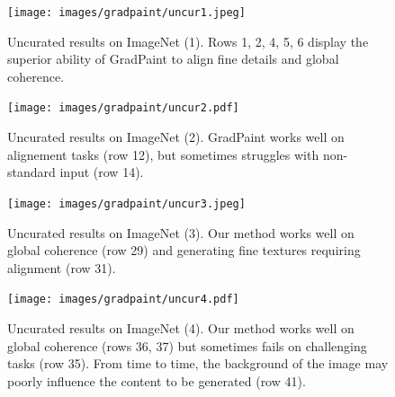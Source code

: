 \begin{figure}[htbp]
  \centering
    \texttt{[image: images/gradpaint/uncur1.jpeg]}
    \caption{Uncurated results on ImageNet (1). Rows 1, 2, 4, 5, 6 display the superior ability of GradPaint to align fine details and global coherence.}
    \label{fig:uncur1}
\end{figure}

\begin{figure}[htbp]
  \centering
    \texttt{[image: images/gradpaint/uncur2.pdf]}
    \caption{Uncurated results on ImageNet (2). GradPaint works well on alignement tasks (row 12), but sometimes struggles with non-standard input (row 14). }
    \label{fig:uncur2}
\end{figure}

\begin{figure}[htbp]
  \centering
    \texttt{[image: images/gradpaint/uncur3.jpeg]}
    \caption{Uncurated results on ImageNet (3). Our method works well on global coherence (row 29) and generating fine textures requiring alignment (row 31).}
    \label{fig:uncur3}
\end{figure}

\begin{figure}[htbp]
  \centering
    \texttt{[image: images/gradpaint/uncur4.pdf]}
    \caption{Uncurated results on ImageNet (4). Our method works well on global coherence (rows 36, 37) but sometimes fails on challenging tasks (row 35). From time to time, the background of the image may poorly influence the content to be generated (row 41).}
    \label{fig:uncur4}
\end{figure}
